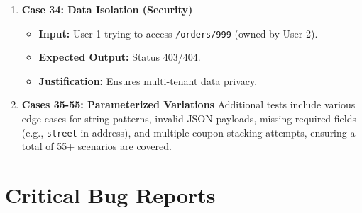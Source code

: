 \documentclass{article}
\begin{document}
\begin{enumerate}
    \item \textbf{Case 34: Data Isolation (Security)}
    \begin{itemize}
        \item \textbf{Input:} User 1 trying to access \texttt{/orders/999} (owned by User 2).
        \item \textbf{Expected Output:} Status 403/404.
        \item \textbf{Justification:} Ensures multi-tenant data privacy.
    \end{itemize}

    \item \textbf{Cases 35-55: Parameterized Variations}
    Additional tests include various edge cases for string patterns, invalid JSON payloads, missing required fields (e.g., \texttt{street} in address), and multiple coupon stacking attempts, ensuring a total of 55+ scenarios are covered.
\end{enumerate}

\section{Critical Bug Reports}
\end{document}
